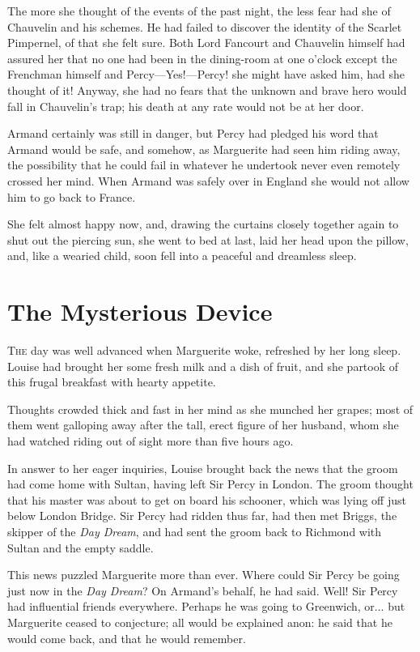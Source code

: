 \documentclass[paper=a5,BCOR=7mm,twoside,DIV=calc,12pt,usegeometry,chapterprefix,endperiod,headings=big]{scrbook}
\begin{document}
The more she thought of the events of the past night, the less fear had she of Chauvelin and his schemes. He had failed to discover the identity of the Scarlet Pimpernel, of that she felt sure. Both Lord Fancourt and Chauvelin himself had assured her that no one had been in the dining-room at one o'clock except the Frenchman himself and Percy---Yes!---Percy! she might have asked him, had she thought of it! Anyway, she had no fears that the unknown and brave hero would fall in Chauvelin's trap; his death at any rate would not be at her door.

Armand certainly was still in danger, but Percy had pledged his word that Armand would be safe, and somehow, as Marguerite had seen him riding away, the possibility that he could fail in whatever he undertook never even remotely crossed her mind. When Armand was safely over in England she would not allow him to go back to France.

She felt almost happy now, and, drawing the curtains closely together again to shut out the piercing sun, she went to bed at last, laid her head upon the pillow, and, like a wearied child, soon fell into a peaceful and dreamless sleep.

\chapter{The Mysterious Device}

\lettrine[lines=4]{T}{he} day was well advanced when Marguerite woke, refreshed by her long sleep. Louise had brought her some fresh milk and a dish of fruit, and she partook of this frugal breakfast with hearty appetite.

Thoughts crowded thick and fast in her mind as she munched her grapes; most of them went galloping away after the tall, erect figure of her husband, whom she had watched riding out of sight more than five hours ago.

In answer to her eager inquiries, Louise brought back the news that the groom had come home with Sultan, having left Sir Percy in London. The groom thought that his master was about to get on board his schooner, which was lying off just below London Bridge. Sir Percy had ridden thus far, had then met Briggs, the skipper of the \textit{Day Dream}, and had sent the groom back to Richmond with Sultan and the empty saddle.

This news puzzled Marguerite more than ever. Where could Sir Percy be going just now in the \textit{Day Dream}? On Armand's behalf, he had said. Well! Sir Percy had influential friends everywhere. Perhaps he was going to Greenwich, or... but Marguerite ceased to conjecture; all would be explained anon: he said that he would come back, and that he would remember.
\end{document}

